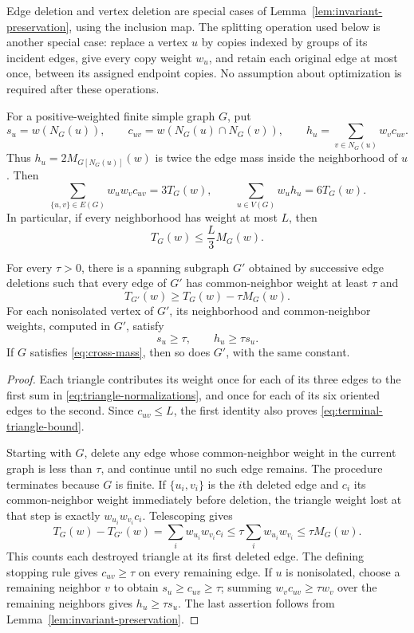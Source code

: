 Edge deletion and vertex deletion are special cases of
Lemma~\ref{lem:invariant-preservation}, using the inclusion map.
The splitting operation used below is another special case: replace a
vertex $u$ by copies indexed by groups of its incident edges, give every
copy weight $w_u$, and retain each original edge at most once, between
its assigned endpoint copies.  No assumption about optimization is
required after these operations.

\begin{lemma}
\label{lem:triangle-peeling}
For a positive-weighted finite simple graph $G$, put
\[
 s_u=w(N_G(u)),\qquad
 c_{uv}=w(N_G(u)\cap N_G(v)),\qquad
 h_u=\sum_{v\in N_G(u)}w_vc_{uv}.
\]
Thus $h_u=2M_{G[N_G(u)]}(w)$ is twice the edge mass inside the
neighborhood of $u$.
Then
\begin{equation}
 \label{eq:triangle-normalizations}
 \sum_{\{u,v\}\in E(G)}w_uw_vc_{uv}=3T_G(w),
 \qquad
 \sum_{u\in V(G)}w_uh_u=6T_G(w).
\end{equation}
In particular, if every neighborhood has weight at most $L$, then
\begin{equation}
 \label{eq:terminal-triangle-bound}
 T_G(w)\le \frac{L}{3}M_G(w).
\end{equation}

For every $\tau>0$, there is a spanning subgraph $G'$ obtained by
successive edge deletions such that every edge of $G'$ has common-neighbor
weight at least $\tau$ and
\begin{equation}
 \label{eq:peeling-loss}
 T_{G'}(w)\ge T_G(w)-\tau M_G(w).
\end{equation}
For each nonisolated vertex of $G'$, its neighborhood and common-neighbor
weights, computed in $G'$, satisfy
\[
 s_u\ge\tau,\qquad h_u\ge\tau s_u.
\]
If $G$ satisfies \eqref{eq:cross-mass}, then so does $G'$,
with the same constant.
\end{lemma}

\begin{proof}
Each triangle contributes its weight once for each of its three edges
to the first sum in \eqref{eq:triangle-normalizations}, and once for
each of its six oriented edges to the second.  Since $c_{uv}\le L$,
the first identity also proves \eqref{eq:terminal-triangle-bound}.

Starting with $G$, delete any edge whose common-neighbor weight in the
current graph is less than $\tau$, and continue until no such edge
remains.  The procedure terminates because $G$ is finite.  If
$\{u_i,v_i\}$ is the $i$th deleted edge and $c_i$ its common-neighbor
weight immediately before deletion, the triangle weight lost at that
step is exactly $w_{u_i}w_{v_i}c_i$.  Telescoping gives
\[
 T_G(w)-T_{G'}(w)
 =\sum_iw_{u_i}w_{v_i}c_i
 \le\tau\sum_iw_{u_i}w_{v_i}
 \le\tau M_G(w).
\]
This counts each destroyed triangle at its first deleted edge.
The defining stopping rule gives $c_{uv}\ge\tau$ on every remaining
edge.  If $u$ is nonisolated, choose a remaining neighbor $v$ to obtain
$s_u\ge c_{uv}\ge\tau$; summing $w_vc_{uv}\ge\tau w_v$ over the
remaining neighbors gives $h_u\ge\tau s_u$.  The last assertion follows
from Lemma~\ref{lem:invariant-preservation}.
\end{proof}
